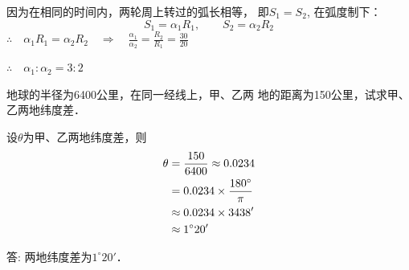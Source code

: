 \begin{solution}
    因为在相同的时间内，两轮周上转过的弧长相等，
    即$S_1=S_2$, 在弧度制下：
\[S_1=\alpha_1 R_1,\qquad S_2=\alpha_2 R_2\]
$\therefore\quad \alpha_1R_1=\alpha_2R_2 \quad \Rightarrow\quad \frac{\alpha_1}{\alpha_2}=\frac{R_2}{R_1}=\frac{30}{20}$

$\therefore\quad \alpha_1:\alpha_2=3:2 $
\end{solution}

\begin{example}
    地球的半径为6400公里，在同一经线上，甲、乙两
地的距离为150公里，试求甲、乙两地纬度差．
\end{example}


\begin{solution}
设$\theta$为甲、乙两地纬度差，则
\[\begin{split}
    \theta &= \dfrac{150}{6400}\approx 0.0234\\
    &=0.0234\times\dfrac{180^{\circ}}{\pi}\\
    &\approx 0.0234\times 3438'\\
    &\approx 1^{\circ}20'
\end{split}\]

答: 两地纬度差为$1^{\circ}20'$．
\end{solution}

